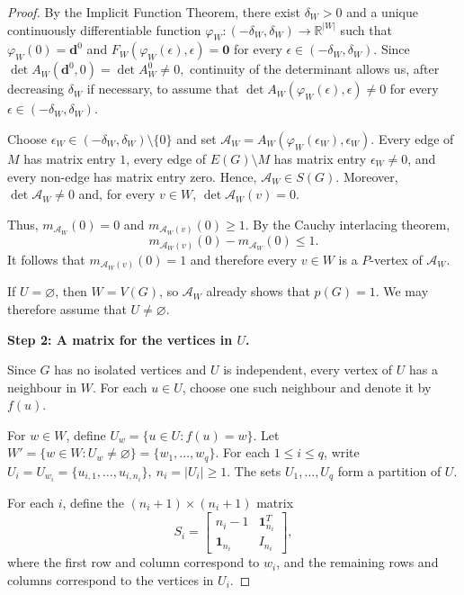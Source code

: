 \documentclass[10pt,a4paper]{amsart}
\begin{document}
\begin{proof}
By the Implicit Function Theorem, there exist \(\delta_W>0\) and a unique
continuously differentiable function
\(
\varphi_W:(-\delta_W,\delta_W)\longrightarrow\mathbb R^{|W|}
\)
such that
\(
\varphi_W(0)=\mathbf d^0
\)
and
\(
F_W(\varphi_W(\epsilon),\epsilon)=\mathbf 0
\)
for every \(\epsilon\in(-\delta_W,\delta_W)\).
Since
\(
\det A_W(\mathbf d^0,0)=\det A_W^0\neq0,
\)
continuity of the determinant allows us, after decreasing \(\delta_W\)
if necessary, to assume that
\(
\det A_W(\varphi_W(\epsilon),\epsilon)\neq0
\)
for every \(\epsilon\in(-\delta_W,\delta_W)\).

Choose
\(
\epsilon_W\in(-\delta_W,\delta_W)\setminus\{0\}
\)
and set
\(
\mathcal A_W
=
A_W(\varphi_W(\epsilon_W),\epsilon_W).
\)
Every edge of \(M\) has matrix entry \(1\), every edge of
\(E(G)\setminus M\) has matrix entry \(\epsilon_W\neq0\), and every
non-edge has matrix entry zero. Hence,
\(
\mathcal A_W\in S(G).
\)
Moreover,
\(
\det\mathcal A_W\neq0
\)
and, for every \(v\in W\),
\(
\det\mathcal A_W(v)=0.
\)

Thus,
\(
m_{\mathcal A_W}(0)=0
\)
and
\(
m_{\mathcal A_W(v)}(0)\geq1.
\)
By the Cauchy interlacing theorem,
\[
m_{\mathcal A_W(v)}(0)-m_{\mathcal A_W}(0)\leq1.
\]
It follows that
\(
m_{\mathcal A_W(v)}(0)=1
\)
and therefore every \(v\in W\) is a \(P\)-vertex of
\(\mathcal A_W\).

If \(U=\varnothing\), then \(W=V(G)\), so \(\mathcal A_W\) already
shows that \(p(G)=1\). We may therefore assume that
\(U\neq\varnothing\).

\medskip

\noindent
\textbf{Step 2: A matrix for the vertices in \(U\).}

Since \(G\) has no isolated vertices and \(U\) is independent, every
vertex of \(U\) has a neighbour in \(W\). For each \(u\in U\), choose
one such neighbour and denote it by \(f(u)\).

For \(w\in W\), define
\(
U_w=\{u\in U:f(u)=w\}.
\)
Let
\(
W'=\{w\in W:U_w\neq\varnothing\}
=
\{w_1,\ldots,w_q\}.
\)
For each \(1\leq i\leq q\), write
\(
U_i=U_{w_i}
=
\{u_{i,1},\ldots,u_{i,n_i}\},
\
n_i=|U_i|\geq1.
\)
The sets \(U_1,\ldots,U_q\) form a partition of \(U\).

For each \(i\), define the \((n_i+1)\times(n_i+1)\) matrix
\[
S_i=
\begin{bmatrix}
n_i-1&\mathbf 1_{n_i}^{T}\\
\mathbf 1_{n_i}&I_{n_i}
\end{bmatrix},
\]
where the first row and column correspond to \(w_i\), and the
remaining rows and columns correspond to the vertices in \(U_i\).


\end{proof}
\end{document}
